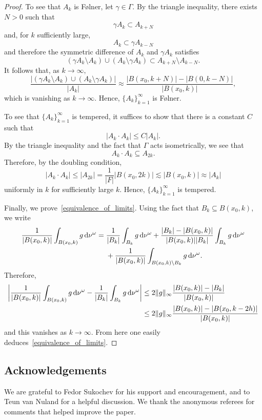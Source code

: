 \documentclass[pdftex]{sigma}
\numberwithin{equation}{section}
\begin{document}
\begin{proof}
 To see that $A_k$ is F{\o}lner, let $\gamma\in \Gamma.$ By the triangle inequality, there exists $N>0$ such that
 \[
 \gamma A_k\subset A_{k+N}
 \]
 and, for $k$ sufficiently large,
 \[
 A_k\subset \gamma A_{k-N}
 \]
 and therefore the symmetric difference of $A_k$ and $\gamma A_k$ satisfies
 \[
 (\gamma A_k\setminus A_k)\cup (A_k\setminus \gamma A_k) \subset A_{k+N}\setminus A_{k-N}.
 \]
 It follows that, as $k\to\infty,$
 \[
 \frac{|(\gamma A_k\setminus A_k)\cup (A_k\setminus \gamma A_k)|}{|A_k|} \approx \frac{|B(x_0,k+N)|-|B(0,k-N)|}{|B(x_0,k)|},
 \]
 which is vanishing as $k\to\infty.$ Hence, $\{A_k\}_{k=1}^\infty$ is F{\o}lner.

 To see that $\{A_k\}_{k=1}^\infty$ is tempered, it suffices to show that there is a constant $C$ such that
 \[
 |A_k\cdot A_k| \leq C|A_k|.
 \]
 By the triangle inequality and the fact that $\Gamma$ acts isometrically, we see that
 \[
 A_k\cdot A_k \subseteq A_{2k}.
 \]
 Therefore, by the doubling condition,
 \[
 |A_k\cdot A_k| \leq |A_{2k}| = \frac{1}{|F|}|B(x_0,2k)| \lesssim |B(x_0,k)| \approx |A_k|
 \]
 uniformly in $k$ for sufficiently large $k.$
 Hence, $\{A_k\}_{k=1}^\infty$ is tempered.

Finally, we prove~\eqref{equivalence_of_limits}. Using the fact that $B_k\subseteq B(x_0,k)$, we write
\begin{align*}
 \frac{1}{|B(x_0,k)|}\int_{B(x_0,k)} g\,{\rm d}\nu^{\omega}={}& \frac{1}{|B_k|}\int_{B_k} g\,{\rm d}\nu^{\omega} + \frac{|B_k|-|B(x_0,k)|}{|B(x_0,k)||B_k|}\int_{B_k} g\,{\rm d}\nu^{\omega} \\
 &{} + \frac{1}{|B(x_0,k)|}\int_{B(x_0,k)\setminus B_k} g\,{\rm d}\nu^{\omega}.
\end{align*}
Therefore,
\begin{align*}
 \bigg|\frac{1}{|B(x_0,k)|}\int_{B(x_0,k)} g\,{\rm d}\nu^{\omega} - \frac{1}{|B_k|}\int_{B_k} g\,{\rm d}\nu^{\omega}\bigg|
 &\leq 2\|g\|_{\infty}\frac{|B(x_0,k)|-|B_k|}{|B(x_0,k)|}\\
 &\leq 2\|g\|_{\infty} \frac{|B(x_0,k)|-|B(x_0,k-2h)|}{|B(x_0,k)|}
\end{align*}
and this vanishes as $k\to\infty.$ From here one easily deduces~\eqref{equivalence_of_limits}.
\end{proof}

\subsection*{Acknowledgements}

We are grateful to Fedor Sukochev for his support and encouragement, and to Teun van Nuland for a helpful discussion. We thank the anonymous referees for comments that helped improve the paper.
\end{document}
